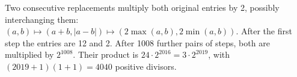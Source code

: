 Two consecutive replacements multiply both original entries by 2, possibly interchanging them: $(a,b)\mapsto(a+b,|a-b|)\mapsto(2\max(a,b),2\min(a,b))$. After the first step the entries are 12 and 2. After 1008 further pairs of steps, both are multiplied by $ 2^{1008}$. Their product is $ 24\cdot2^{2016}=3\cdot2^{2019}$, with $(2019+1)(1+1)=\boxed{4040}$ positive divisors.
